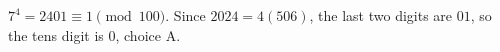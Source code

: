 $7^4=2401\equiv1\pmod{100}$. Since $2024=4(506)$, the last two digits are $01$, so the tens digit is $\boxed0$, choice A.

